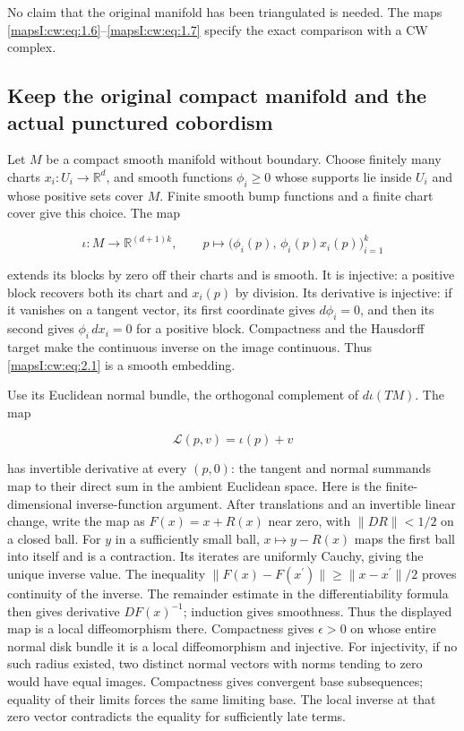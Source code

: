 \documentclass[11pt]{article}
\begin{document}
No claim that the original manifold has been triangulated is needed. The maps \eqref{mapsI:cw:eq:1.6}--\eqref{mapsI:cw:eq:1.7} specify the exact comparison with a CW complex.

\subsection{Keep the original compact manifold and the actual punctured cobordism}
\label{mapsI:cw:cw-manifolds}

Let \(M\) be a compact smooth manifold without boundary. Choose finitely many charts \(x_i:U_i\to\mathbb R^d\), and smooth functions \(\phi_i\geq0\) whose supports lie inside \(U_i\) and whose positive sets cover \(M\). Finite smooth bump functions and a finite chart cover give this choice. The map

\begin{equation}
\iota:M\longrightarrow\mathbb R^{(d+1)k},\qquad
p\longmapsto\bigl(\phi_i(p),\,\phi_i(p)x_i(p)\bigr)_{i=1}^k
\label{mapsI:cw:eq:2.1}
\end{equation}

extends its blocks by zero off their charts and is smooth. It is injective: a positive block recovers both its chart and \(x_i(p)\) by division. Its derivative is injective: if it vanishes on a tangent vector, its first coordinate gives \(d\phi_i=0\), and then its second gives \(\phi_i\,dx_i=0\) for a positive block. Compactness and the Hausdorff target make the continuous inverse on the image continuous. Thus \eqref{mapsI:cw:eq:2.1} is a smooth embedding.

Use its Euclidean normal bundle, the orthogonal complement of \(d\iota(TM)\). The map

\begin{equation}
\mathcal L(p,v)=\iota(p)+v
\label{mapsI:cw:eq:2.2}
\end{equation}

has invertible derivative at every \((p,0)\): the tangent and normal summands map to their direct sum in the ambient Euclidean space. Here is the finite-dimensional inverse-function argument. After translations and an invertible linear change, write the map as \(F(x)=x+R(x)\) near zero, with \(\|DR\|<1/2\) on a closed ball. For \(y\) in a sufficiently small ball, \(x\mapsto y-R(x)\) maps the first ball into itself and is a contraction. Its iterates are uniformly Cauchy, giving the unique inverse value. The inequality \(\|F(x)-F(x^{\prime})\|\ge\|x-x^{\prime}\|/2\) proves continuity of the inverse. The remainder estimate in the differentiability formula then gives derivative \(DF(x)^{-1}\); induction gives smoothness. Thus the displayed map is a local diffeomorphism there. Compactness gives \(\epsilon>0\) on whose entire normal disk bundle it is a local diffeomorphism and injective. For injectivity, if no such radius existed, two distinct normal vectors with norms tending to zero would have equal images. Compactness gives convergent base subsequences; equality of their limits forces the same limiting base. The local inverse at that zero vector contradicts the equality for sufficiently late terms.
\end{document}
